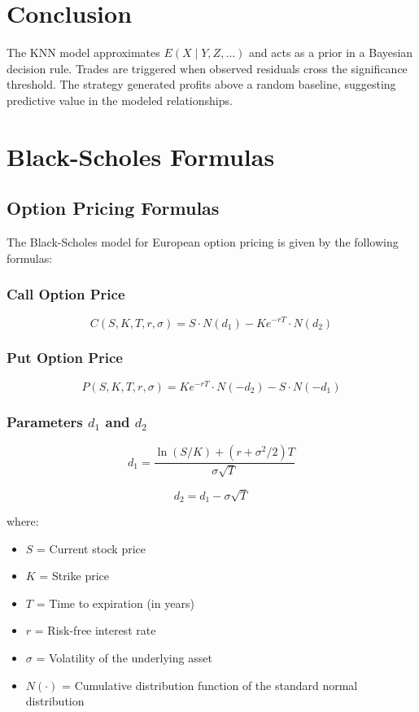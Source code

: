 \documentclass{article}
\begin{document}
\section{Conclusion}
The KNN model approximates $E(X\mid Y,Z,\ldots)$ and acts as a prior in a Bayesian decision rule. Trades are triggered when observed residuals cross the significance threshold. The strategy generated profits above a random baseline, suggesting predictive value in the modeled relationships.

\appendix
\section{Black-Scholes Formulas}
\subsection{Option Pricing Formulas}
The Black-Scholes model for European option pricing is given by the following formulas:

\subsubsection{Call Option Price}
\begin{equation}
C(S, K, T, r, \sigma) = S \cdot N(d_1) - K e^{-rT} \cdot N(d_2)
\end{equation}

\subsubsection{Put Option Price}
\begin{equation}
P(S, K, T, r, \sigma) = K e^{-rT} \cdot N(-d_2) - S \cdot N(-d_1)
\end{equation}

\subsubsection{Parameters $d_1$ and $d_2$}
\begin{equation}
d_1 = \frac{\ln(S/K) + (r + \sigma^2/2)T}{\sigma\sqrt{T}}
\end{equation}

\begin{equation}
d_2 = d_1 - \sigma\sqrt{T}
\end{equation}

where:
\begin{itemize}
  \item $S$ = Current stock price
  \item $K$ = Strike price
  \item $T$ = Time to expiration (in years)
  \item $r$ = Risk-free interest rate
  \item $\sigma$ = Volatility of the underlying asset
  \item $N(\cdot)$ = Cumulative distribution function of the standard normal distribution
\end{itemize}
\end{document}
